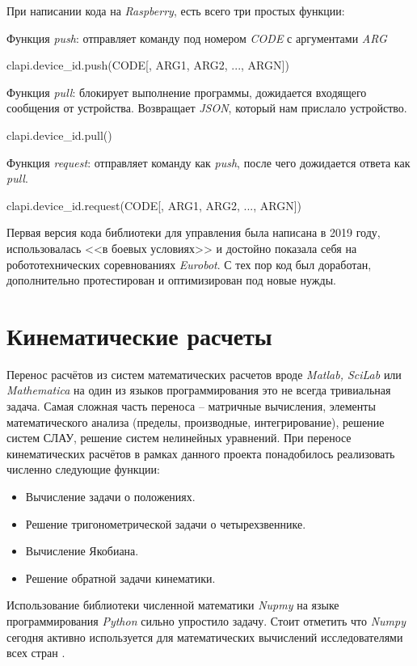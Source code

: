 При написании кода на \textit{Raspberry}, есть всего три простых функции:

\noindent Функция \textit{push}: отправляет команду под номером \textit{CODE} с аргументами \textit{ARG}
\begin{code}
clapi.device_id.push(CODE[, ARG1, ARG2, ..., ARGN])
\end{code}

\noindent Функция \textit{pull}: блокирует выполнение программы, дожидается входящего сообщения от устройства. Возвращает \textit{JSON}, который нам прислало устройство.
\begin{code}
clapi.device_id.pull()
\end{code}

\noindent Функция \textit{request}: отправляет команду как \textit{push}, после чего дожидается ответа как \textit{pull}.
\begin{code}
clapi.device_id.request(CODE[, ARG1, ARG2, ..., ARGN])
\end{code}

Первая версия кода библиотеки для управления была написана в 2019 году, использовалась <<в боевых условиях>> и достойно показала себя на робототехнических соревнованиях \textit{Eurobot}. С тех пор код был доработан, дополнительно протестирован и оптимизирован под новые нужды.

\section{Кинематические расчеты}

Перенос расчётов из систем математических расчетов вроде \textit{Matlab, SciLab} или \textit{Mathematica} на один из языков программирования это не всегда тривиальная задача. Самая сложная часть переноса -- матричные вычисления, элементы математического анализа (пределы, производные, интегрирование), решение систем СЛАУ, решение систем нелинейных уравнений. При переносе кинематических расчётов в рамках данного проекта понадобилось реализовать численно следующие функции:
\begin{itemize}
    \item Вычисление задачи о положениях.
    \item Решение тригонометрической задачи о четырехзвеннике.
    \item Вычисление Якобиана.
    \item Решение обратной задачи кинематики.
\end{itemize}

Использование библиотеки численной математики \textit{Nupmy} на языке программирования \textit{Python} сильно упростило задачу. Стоит отметить что \textit{Numpy} сегодня активно используется для математических вычислений исследователями всех стран \cite{Numpy2020}.

